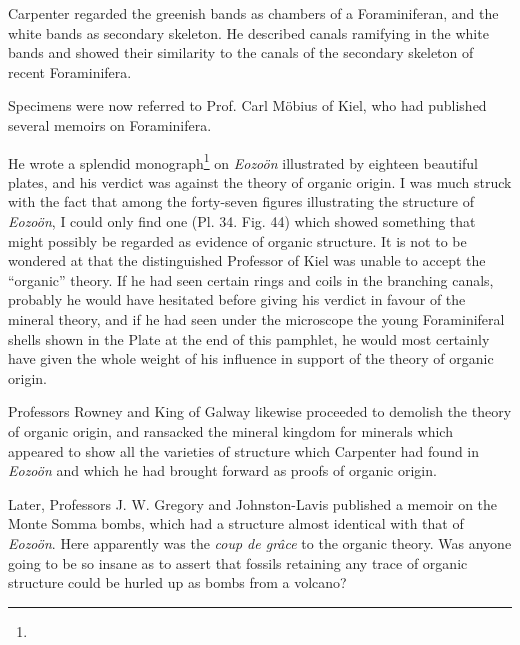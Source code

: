 \documentclass[a4paper, 12pt, oneside]{article}
\begin{document}
Carpenter regarded the greenish bands as chambers of a Foraminiferan, and the white bands as secondary skeleton. He described canals ramifying in the white bands and showed their similarity to the canals of the secondary skeleton of recent Foraminifera.

Specimens were now referred to Prof. Carl Möbius of Kiel, who had published several memoirs on Foraminifera.

He wrote a splendid monograph\footnote{} on \emph{Eozoön} illustrated by eighteen beautiful plates, and his verdict was against the theory of organic origin. I was much struck with the fact that among the forty-seven figures illustrating the structure of \emph{Eozoön}, I could only find one (Pl. 34. Fig. 44) which showed something that might possibly be regarded as evidence of organic structure. It is not to be wondered at that the distinguished Professor of Kiel was unable to accept the ``organic'' theory. If he had seen certain rings and coils in the branching canals, probably he would have hesitated before giving his verdict in favour of the mineral theory, and if he had seen under the microscope the young Foraminiferal shells shown in the Plate at the end of this pamphlet, he would most certainly have given the whole weight of his influence in support of the theory of organic origin.

Professors Rowney and King of Galway likewise proceeded to demolish the theory of organic origin, and ransacked the mineral kingdom for minerals which appeared to show all the varieties of structure which Carpenter had found in \emph{Eozoön} and which he had brought forward as proofs of organic origin.

Later, Professors J. W. Gregory and Johnston-Lavis published a memoir on the Monte Somma bombs, which had a structure almost identical with that of \emph{Eozoön}. Here apparently was the \emph{coup de grâce} to the organic theory. Was anyone going to be so insane as to assert that fossils retaining any trace of organic structure could be hurled up as bombs from a volcano?
\end{document}

